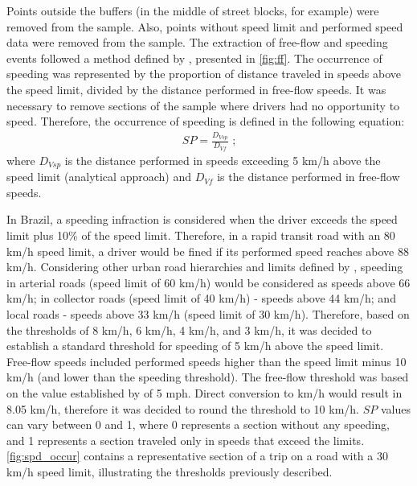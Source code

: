Points outside the buffers (in the middle of street blocks, for example) were removed from the sample. Also, points without speed limit and performed speed data were removed from the sample. The extraction of free-flow and speeding events followed a method defined by \textcite{Richard2013}, presented in \autoref{fig:ff}. The occurrence of speeding was represented by the proportion of distance traveled in speeds above the speed limit, divided by the distance performed in free-flow speeds. It was necessary to remove sections of the sample where drivers had no opportunity to speed. Therefore, the occurrence of speeding is defined in the following equation: \begin{align}
    SP = \frac{D_{Vsp}}{D_{Vf}} \mbox{ ;} 
    \label{eq:sp}
\end{align} where $D_{Vsp}$ is the distance performed in speeds exceeding 5 km/h above the speed limit (analytical approach) and $D_{Vf}$ is the distance performed in free-flow speeds. 

In Brazil, a speeding infraction is considered when the driver exceeds the speed limit plus 10\% of the speed limit. Therefore, in a rapid transit road with an 80 km/h speed limit, a driver would be fined if its performed speed reaches above 88 km/h. Considering other urban road hierarchies and limits defined by \textcite{Brasil1997}, speeding in arterial roads (speed limit of 60 km/h) would be considered as speeds above 66 km/h; in collector roads (speed limit of 40 km/h) - speeds above 44 km/h; and local roads - speeds above 33 km/h (speed limit of 30 km/h). Therefore, based on the thresholds of 8 km/h, 6 km/h, 4 km/h, and 3 km/h, it was decided to establish a standard threshold for speeding of 5 km/h above the speed limit. Free-flow speeds included performed speeds higher than the speed limit minus 10 km/h (and lower than the speeding threshold). The free-flow threshold was based on the value established by \textcite{Richard2017} of 5 mph. Direct conversion to km/h would result in 8.05 km/h, therefore it was decided to round the threshold to 10 km/h. $SP$ values can vary between 0 and 1, where 0 represents a section without any speeding, and 1 represents a section traveled only in speeds that exceed the limits. \autoref{fig:spd_occur} contains a representative section of a trip on a road with a 30 km/h speed limit, illustrating the thresholds previously described.   


